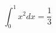 \documentclass[12pt]{article}
\begin{document}
    \begin{equation}
        \int_{0}^{1} x^2 dx = \frac{1}{3}
    \end{equation}
\end{document}
